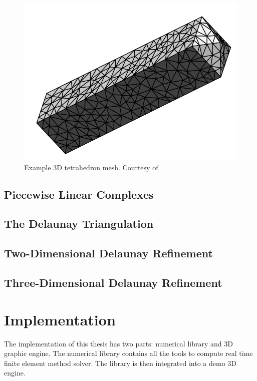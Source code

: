 \documentclass[en]{minipw} %
\begin{document}
\begin{figure}[h!]
\centering
\includegraphics[scale=0.5]{pictures/3dmesh.png}
\caption[Fine tetrahedron mesh]{Example 3D tetrahedron mesh. Courtesy of~\cite{delaunay_mesh}}
\end{figure}

\section{Piecewise Linear Complexes}
\label{sec:plc}

\section{The Delaunay Triangulation}

\section{Two-Dimensional Delaunay Refinement}

\section{Three-Dimensional Delaunay Refinement}

\chapter{Implementation}
\label{chap:Implementation}

The implementation of this thesis has two parts: numerical library and 3D graphic engine. The numerical library contains all the tools to compute real time finite element method solver. The library is then integrated into a demo 3D engine.
\end{document}
